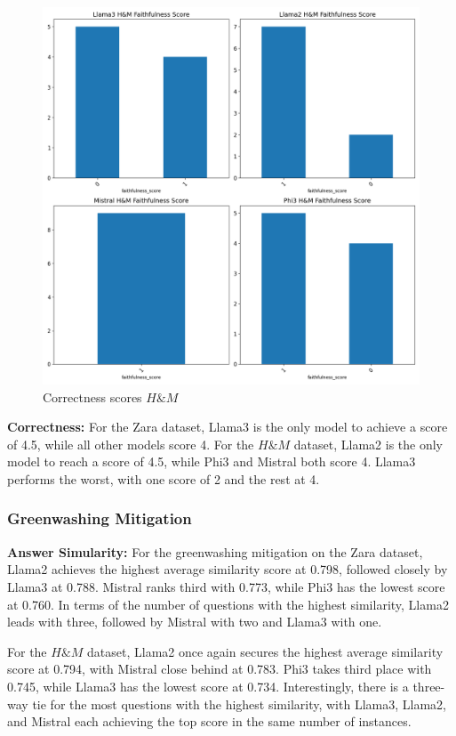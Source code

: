 \documentclass[]{article}
\begin{document}
\begin{figure}[H]
\begin{minipage}{0.49\textwidth}
        \includegraphics[width=\textwidth]{./images/faith_hm_scene_det.png}
        \caption{Correctness scores $H\&M$}
        \label{fig:faith_hm}
    \end{minipage}
\end{figure}

\textbf{Correctness:}
For the Zara dataset, Llama3 is the only model to achieve a score of 4.5, while all other models score 4.  
For the $H\&M$ dataset, Llama2 is the only model to reach a score of 4.5, while Phi3 and Mistral both score 4. Llama3 performs the worst, with one score of 2 and the rest at 4.

\subsubsection{Greenwashing Mitigation}
\textbf{Answer Simularity:} 
For the greenwashing mitigation on the Zara dataset, Llama2 achieves the highest average similarity score at 0.798, followed closely by Llama3 at 0.788. 
Mistral ranks third with 0.773, while Phi3 has the lowest score at 0.760. In terms of the number of questions with the highest similarity, Llama2 leads with three, followed by Mistral with two and Llama3 with one.

For the $H\&M$ dataset, Llama2 once again secures the highest average similarity score at 0.794, with Mistral close behind at 0.783. Phi3 takes third place with 0.745, while Llama3 has the lowest score at 0.734. 
Interestingly, there is a three-way tie for the most questions with the highest similarity, with Llama3, Llama2, and Mistral each achieving the top score in the same number of instances.
\end{document}
